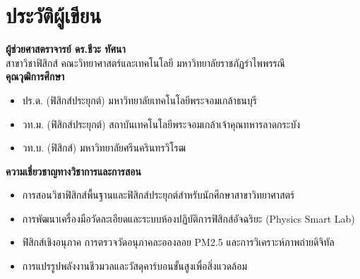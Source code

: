 \chapter*{ประวัติผู้เขียน}

\begin{center}
    \begin{tcolorbox}[
        enhanced,
        colback=softSmoke,
        colframe=physRoyalBlue,
        arc=4mm,
        boxrule=1.2pt,
        width=\textwidth,
        drop shadow={black!15}
    ]
        \vspace{6pt}
        \textbf{\Large ผู้ช่วยศาสตราจารย์ ดร.ชีวะ ทัศนา}\\[6pt]
        {\large สาขาวิชาฟิสิกส์ คณะวิทยาศาสตร์และเทคโนโลยี มหาวิทยาลัยราชภัฏรำไพพรรณี}\\[8pt]
        
        \textbf{คุณวุฒิการศึกษา}
        \begin{itemize}
            \item ปร.ด. (ฟิสิกส์ประยุกต์) มหาวิทยาลัยเทคโนโลยีพระจอมเกล้าธนบุรี
            \item วท.ม. (ฟิสิกส์ประยุกต์) สถาบันเทคโนโลยีพระจอมเกล้าเจ้าคุณทหารลาดกระบัง
            \item วท.บ. (ฟิสิกส์) มหาวิทยาลัยศรีนครินทรวิโรฒ
        \end{itemize}
        
        \textbf{ความเชี่ยวชาญทางวิชาการและการสอน}
        \begin{itemize}
            \item การสอนวิชาฟิสิกส์พื้นฐานและฟิสิกส์ประยุกต์สำหรับนักศึกษาสาขาวิทยาศาสตร์
            \item การพัฒนาเครื่องมือวัดละเอียดและระบบห้องปฏิบัติการฟิสิกส์อัจฉริยะ (Physics Smart Lab)
            \item ฟิสิกส์เชิงอนุภาค การตรวจวัดอนุภาคละอองลอย PM2.5 และการวิเคราะห์ภาพถ่ายดิจิทัล
            \item การแปรรูปพลังงานชีวมวลและวัสดุคาร์บอนขั้นสูงเพื่อสิ่งแวดล้อม
        \end{itemize}
        \vspace{6pt}
    \end{tcolorbox}
\end{center}
